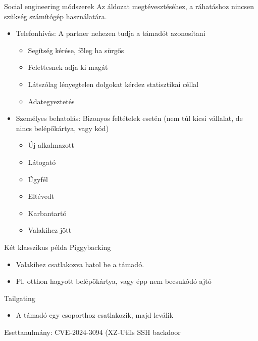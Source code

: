 \documentclass[12 pt]{beamer}
\begin{document}
\begin{frame}{Social engineering módszerek}
  Az áldozat megtévesztéséhez, a ráhatáshoz nincsen szükség számítógép használatára.

  \begin{itemize}
    \item{Telefonhívás: A partner nehezen tudja a támadót azonosítani}
      \begin{itemize}
        \item{Segítség kérése, főleg ha sürgős}
        \item{Felettesnek adja ki magát}
        \item{Látszólag lényegtelen dolgokat kérdez statisztikai céllal}
        \item{Adategyeztetés}
      \end{itemize}
    \item{Személyes behatolás: Bizonyos feltételek esetén (nem túl kicsi vállalat, de nincs belépőkártya, vagy kód)}
      \begin{itemize}
        \item{Új alkalmazott}
        \item{Látogató}
        \item{Ügyfél}
        \item{Eltévedt}
        \item{Karbantartó}
        \item{Valakihez jött}
      \end{itemize}
  \end{itemize}

\end{frame}


\begin{frame}{Két klasszikus példa}
Piggybacking

  \begin{itemize}
    \item{Valakihez csatlakozva hatol be a támadó.}
    \item{Pl. otthon hagyott belépőkártya, vagy épp nem becsukódó ajtó}
  \end{itemize}

Tailgating

  \begin{itemize}
    \item{A támadó egy csoporthoz csatlakozik, majd leválik}
  \end{itemize}

\end{frame}


\begin{frame}{Esettanulmány: CVE-2024-3094 (XZ-Utils SSH backdoor}
\end{frame}

\end{document}
